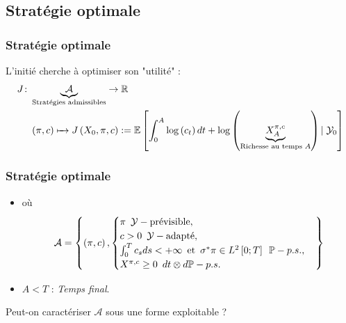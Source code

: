 \documentclass{beamer}
\begin{document}
\subsection{Stratégie optimale}
\begin{frame}
\frametitle{Stratégie optimale}
\par L'initié cherche à optimiser son "utilité" :
\small
\begin{align*}
      J \colon &\underbrace{\mathcal{A}}_{\text{Stratégies admissibles}} \to \mathbb{R} \\
       &\left( \pi, c \right) \xmapsto{\phantom{\mathcal{A}}} J \left( X_0, \pi, c \right) := \mathbb{E} \left[ \int_0^A \log  \left( c_t \right) dt + \log \left( \underbrace{X_A^{\pi, c}}_{\text{Richesse au temps } A} \right) \left\vert\right. \mathcal{Y}_0 \right]
\end{align*}

\end{frame}

\begin{frame}
\frametitle{Stratégie optimale}

\begin{itemize}

\item où
\begin{displaymath}
\mathcal{A} = \left\lbrace \left( \pi, c \right), 
\begin{cases} 
\pi \enskip \mathcal{Y}-\text{prévisible}, \\
c > 0 \enskip \mathcal{Y}-\text{adapté}, \\ 
\int_0^T c_s ds < + \infty \enskip \text{et} \enskip \sigma^* \pi \in L^2 \left[ 0; T \right] \enskip \mathbb{P}-p.s., \\
X^{\pi, c} \geq 0 \enskip dt \otimes d \mathbb{P}-p.s. 
\end{cases}
\right\rbrace
\end{displaymath} 
\item $A < T$ : \emph{Temps final}.
\end{itemize}
\par Peut-on caractériser $\mathcal{A}$ sous une forme exploitable ?
\end{frame}
\end{document}
